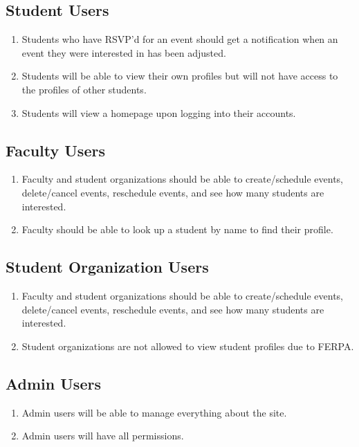 \documentclass{article}
\begin{document}
		\subsection{Student Users}
			\begin{enumerate}[leftmargin=3\parindent]
				\item Students who have RSVP’d for an event should get a notification when an event they were interested in has been adjusted.
				\item Students will be able to view their own profiles but will not have access to the profiles of other students.
				\item Students will view a homepage upon logging into their accounts.
			\end{enumerate}
		\subsection{Faculty Users}
			\begin{enumerate}[leftmargin=3\parindent]
				\item Faculty and student organizations should be able to create/schedule events, delete/cancel events, reschedule events, and see how many students are interested. 
				\item Faculty should be able to look up a student by name to find their profile.
			\end{enumerate}
		\subsection{Student Organization Users}
			\begin{enumerate}[leftmargin=3\parindent]
				\item Faculty and student organizations should be able to create/schedule events, delete/cancel events, reschedule events, and see how many students are interested.
				\item Student organizations are not allowed to view student profiles due to FERPA.
			\end{enumerate}
		\subsection{Admin Users}
			\begin{enumerate}[leftmargin=3\parindent]
				\item Admin users will be able to manage everything about the site.
				\item Admin users will have all permissions.
			\end{enumerate}
\end{document}
